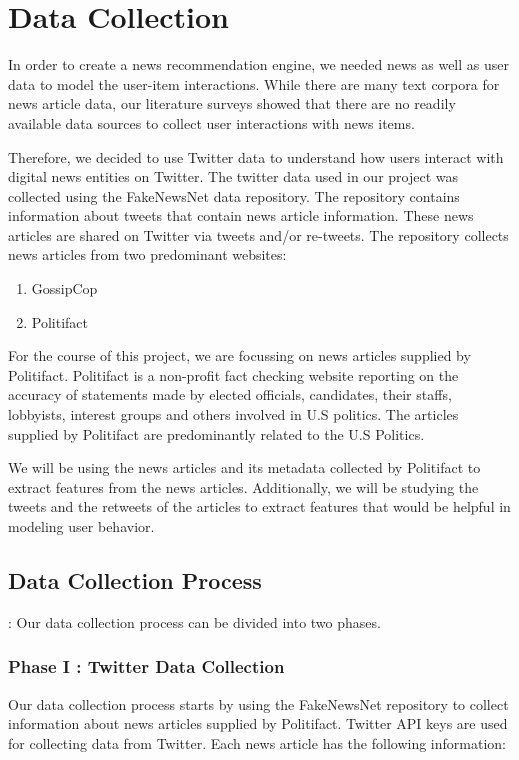 \documentclass{article}
\begin{document}
\section{Data Collection}

In order to create a news recommendation engine, we needed news as well as user data to model the user-item interactions. While there are many text corpora for news article data, our literature surveys showed that there are no readily available data sources to collect user interactions with news items. 

Therefore, we decided to use Twitter data to understand how users interact with digital news entities on Twitter. 
The twitter data used in our project was collected using the FakeNewsNet \cite{fakenewsnet} data repository. The repository contains information about tweets that contain news article information. These news articles are shared on Twitter via tweets and/or re-tweets. The repository collects news articles from two predominant websites:
\begin{enumerate}
\item GossipCop
\item Politifact
\end{enumerate}

For the course of this project, we are focussing on news articles supplied by Politifact. Politifact is a non-profit fact checking website reporting on the accuracy of statements made by elected officials, candidates, their staffs, lobbyists, interest groups and others involved in U.S politics. The articles supplied by Politifact are predominantly related to the U.S Politics. 

We will be using the news articles and its metadata collected by Politifact to extract features from the news articles. Additionally, we will be studying the tweets and the retweets of the articles to extract features that would be helpful in modeling user behavior. \\

\subsection{Data Collection Process}:
Our data collection process can be divided into two phases.

\subsubsection{Phase I : Twitter Data Collection}
Our data collection process starts by using the FakeNewsNet \cite{fakenewsnet} repository to collect information about news articles supplied by Politifact. Twitter API keys are used for collecting data from Twitter.
Each news article has the following information:
\end{document}
